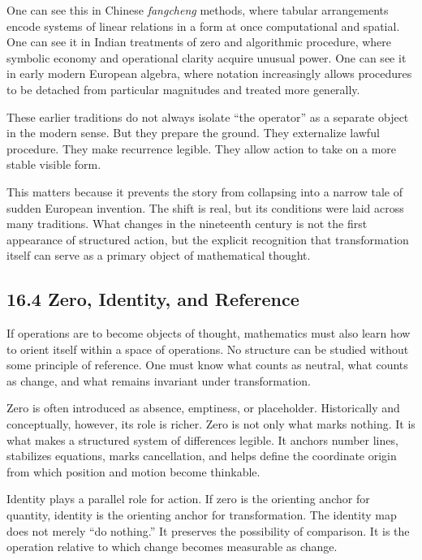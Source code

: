 One can see this in Chinese \emph{fangcheng} methods, where tabular
arrangements encode systems of linear relations in a form at once
computational and spatial. One can see it in Indian treatments of zero
and algorithmic procedure, where symbolic economy and operational
clarity acquire unusual power. One can see it in early modern European
algebra, where notation increasingly allows procedures to be detached
from particular magnitudes and treated more generally.

These earlier traditions do not always isolate ``the operator'' as a
separate object in the modern sense. But they prepare the ground. They
externalize lawful procedure. They make recurrence legible. They allow
action to take on a more stable visible form.

This matters because it prevents the story from collapsing into a narrow
tale of sudden European invention. The shift is real, but its conditions
were laid across many traditions. What changes in the nineteenth century
is not the first appearance of structured action, but the explicit
recognition that transformation itself can serve as a primary object of
mathematical thought.

\hypertarget{zero-identity-and-reference}{%
\subsection{16.4 Zero, Identity, and
Reference}\label{zero-identity-and-reference}}

If operations are to become objects of thought, mathematics must also
learn how to orient itself within a space of operations. No structure
can be studied without some principle of reference. One must know what
counts as neutral, what counts as change, and what remains invariant
under transformation.

Zero is often introduced as absence, emptiness, or placeholder.
Historically and conceptually, however, its role is richer. Zero is not
only what marks nothing. It is what makes a structured system of
differences legible. It anchors number lines, stabilizes equations,
marks cancellation, and helps define the coordinate origin from which
position and motion become thinkable.

Identity plays a parallel role for action. If zero is the orienting
anchor for quantity, identity is the orienting anchor for
transformation. The identity map does not merely ``do nothing.'' It
preserves the possibility of comparison. It is the operation relative to
which change becomes measurable as change.

